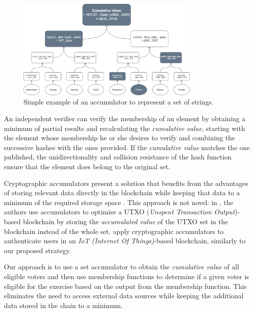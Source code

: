 \documentclass[../main.tex]{subfiles}
\begin{document}
\begin{figure}[htp]
    \centering
    \includegraphics[width=0.8\textwidth]{../Images/AccumulatorExample.png}
    \caption{Simple example of an accumulator to represent a set of strings.}
    \label{fig:accumulator_example}
\end{figure}

An independent verifier can verify the membership of an element by obtaining a minimum of partial results and recalculating the \textit{cumulative value}, starting with the element whose membership he or she desires to verify and combining the successive hashes with the ones provided. If the \textit{cumulative value} matches the one published, the unidirectionality and collision resistance of the hash function ensure that the element does belong to the original set.
\par
Cryptographic accumulators present a solution that benefits from the advantages of storing relevant data directly in the blockchain while keeping that data to a minimum of the required storage space \cite{Wang2021a}. This approach is not novel: in \cite{Chen2020}, the authors use accumulators to optimise a UTXO (\textit{Unspent Transaction Output})-based blockchain by storing the \textit{accumulated value} of the UTXO set in the blockchain instead of the whole set. \cite{Wang2022} apply cryptographic accumulators to authenticate users in an \textit{IoT (Internet Of Things)}-based blockchain, similarly to our proposed strategy.
\par
Our approach is to use a set accumulator to obtain the \textit{cumulative value} of all eligible voters and then use membership functions to determine if a given voter is eligible for the exercise based on the output from the membership function. This eliminates the need to access external data sources while keeping the additional data stored in the chain to a minimum.
\end{document}
